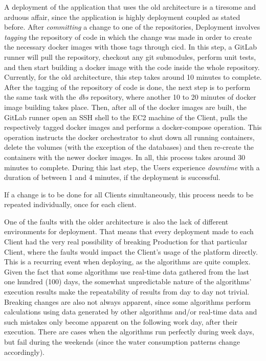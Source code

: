 A deployment of the application that uses the old architecture is a tiresome and arduous affair, since the application is highly deployment coupled as stated before. After \textit{committing} a change to one of the repositories, Deployment involves \textit{tagging} the repository of code in which the change was made in order to create the necessary docker images with those tags through \gls{cicd}. In this step, a GitLab runner will pull the repository, checkout any git submodules, perform unit tests, and then start building a docker image with the code inside the whole repository. Currently, for the old architecture, this step takes around 10 minutes to complete. After the tagging of the repository of code is done, the next step is to perform the same task with the \textit{dbs} repository, where another 10 to 20 minutes of docker image building takes place. Then, after all of the docker images are built, the GitLab runner open an SSH shell to the EC2 machine of the Client, pulls the respectively tagged docker images and performs a docker-compose operation. This operation instructs the docker orchestrator to shut down all running containers, delete the volumes (with the exception of the databases) and then re-create the containers with the newer docker images. In all, this process takes around 30 minutes to complete. During this last step, the Users experience \textit{downtime} with a duration of between 1 and 4 minutes, if the deployment is successful.

If a change is to be done for all Clients simultaneously, this process needs to be repeated individually, once for each client. 

One of the faults with the older architecture is also the lack of different environments for deployment. That means that every deployment made to each Client had the very real possibility of breaking Production for that particular Client, where the faults would impact the Client's usage of the platform directly. This is a recurring event when deploying, as the algorithms are quite complex. Given the fact that some algorithms use real-time data gathered from the last one hundred (100) days, the somewhat unpredictable nature of the algorithms' execution results make the repeatability of results from day to day not trivial.
Breaking changes are also not always apparent, since some algorithms perform calculations using data generated by other algorithms and/or real-time data and such mistakes only become apparent on the following work day, after their execution. There are cases when the algorithms run perfectly during week days, but fail during the weekends (since the water consumption patterns change accordingly).


